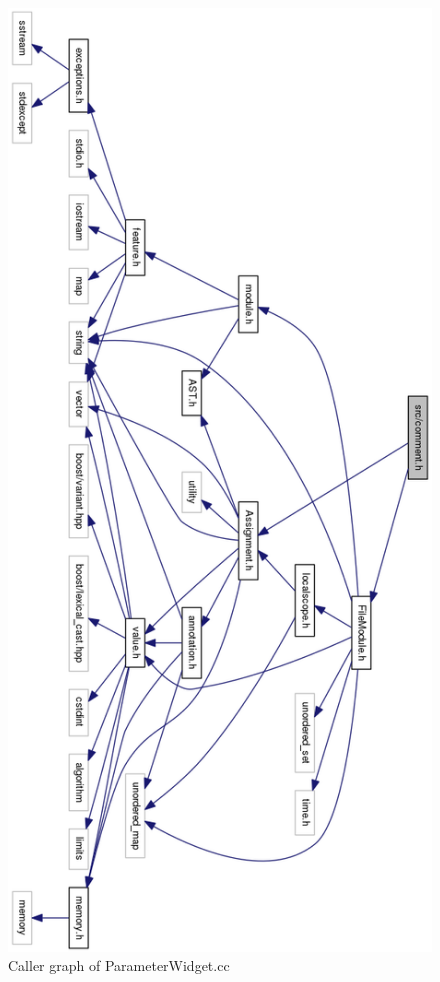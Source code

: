\begin{figure}[H]
\centering
\includegraphics[width=\linewidth,height=1.35\columnwidth]{images/comment1}
\caption{Caller graph of ParameterWidget.cc}
\label{fig:comment1}
\end{figure}

